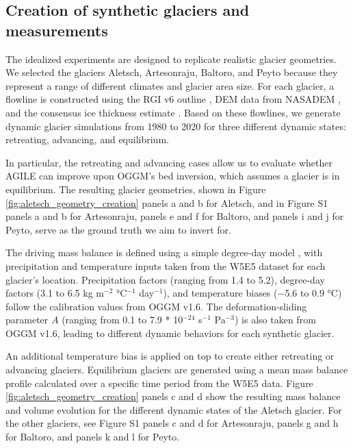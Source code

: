 \documentclass[journal abbreviation, manuscript]{copernicus}
\begin{document}
\subsection{Creation of synthetic glaciers and measurements}
\label{sec:creation_of_synthetic_glaciers}

The idealized experiments are designed to replicate realistic glacier geometries. We selected the glaciers Aletsch, Artesonraju, Baltoro, and Peyto because they represent a range of different climates and glacier area size. For each glacier, a flowline is constructed using the RGI v6 outline \citep{RGI}, DEM data from NASADEM \citep{NASADEM}, and the consensus ice thickness estimate \citep{Farinotti2019}. Based on these flowlines, we generate dynamic glacier simulations from 1980 to 2020 for three different dynamic states: retreating, advancing, and equilibrium.

In particular, the retreating and advancing cases allow us to evaluate whether AGILE can improve upon OGGM’s bed inversion, which assumes a glacier is in equilibrium. The resulting glacier geometries, shown in  Figure \ref{fig:aletsch_geometry_creation} panels a and b for Aletsch, and in Figure S1 panels a and b for Artesonraju, panels e and f for Baltoro, and panels i and j for Peyto, serve as the ground truth we aim to invert for.

The driving mass balance is defined using a simple degree-day model \citep[see Equation 1 in][]{Schuster2023}, with precipitation and temperature inputs taken from the W5E5 dataset \citep{W5E5} for each glacier’s location. Precipitation factors (ranging from 1.4 to 5.2), degree-day factors (3.1 to 6.5 kg m$^{-2}$ °C$^{-1}$ day$^{-1}$), and temperature biases (−5.6 to 0.9 °C) follow the calibration values from OGGM v1.6. The deformation-sliding parameter $A$ (ranging from 0.1 to 7.9 * 10$^{-24}$ s$^{-1}$ Pa$^{-3}$) is also taken from OGGM v1.6, leading to different dynamic behaviors for each synthetic glacier.

An additional temperature bias is applied on top to create either retreating or advancing glaciers. Equilibrium glaciers are generated using a mean mass balance profile calculated over a specific time period from the W5E5 data. Figure \ref{fig:aletsch_geometry_creation} panels c and d show the resulting mass balance and volume evolution for the different dynamic states of the Aletsch glacier. For the other glaciers, see Figure S1 panels c and d for Artesonraju, panels g and h for Baltoro, and panels k and l for Peyto.
\end{document}

